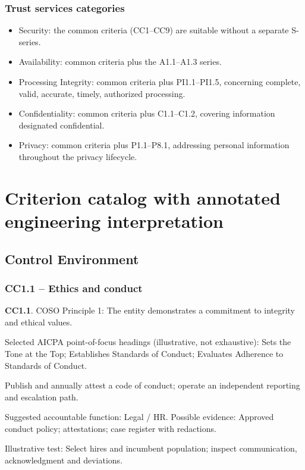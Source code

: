 \documentclass[10pt,oneside]{report}
\begin{document}
\subsection{Trust services categories}
\begin{itemize}
\item Security: the common criteria (CC1--CC9) are suitable without a separate S-series.
\item Availability: common criteria plus the A1.1--A1.3 series.
\item Processing Integrity: common criteria plus PI1.1--PI1.5, concerning complete, valid, accurate, timely, authorized processing.
\item Confidentiality: common criteria plus C1.1--C1.2, covering information designated confidential.
\item Privacy: common criteria plus P1.1--P8.1, addressing personal information throughout the privacy lifecycle.
\end{itemize}

\chapter{Criterion catalog with annotated engineering interpretation}
\section{Control Environment}
\subsection*{CC1.1 -- Ethics and conduct}
\begin{aicpabox}
\textbf{CC1.1}. COSO Principle 1: The entity demonstrates a commitment to integrity and ethical values.\par{}
\end{aicpabox}
Selected AICPA point-of-focus headings (illustrative, not exhaustive): Sets the Tone at the Top; Establishes Standards of Conduct; Evaluates Adherence to Standards of Conduct.

\begin{engineeringbox}
Publish and annually attest a code of conduct; operate an independent reporting and escalation path.
\end{engineeringbox}
Suggested accountable function: Legal / HR. Possible evidence: Approved conduct policy; attestations; case register with redactions.

Illustrative test: Select hires and incumbent population; inspect communication, acknowledgment and deviations.
\end{document}
